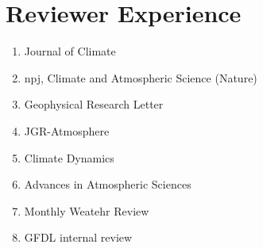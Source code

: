 \documentclass{article}
\begin{document}
\section{\color{airforceblue}Reviewer Experience}
\begin{enumerate}
	\item Journal of Climate 
	\item npj, Climate and Atmospheric Science (Nature)
	\item Geophysical Research Letter
	\item JGR-Atmosphere
	\item Climate Dynamics
	\item Advances in Atmospheric Sciences
	\item Monthly Weatehr Review
	\item GFDL internal review
\end{enumerate}
\end{document}
